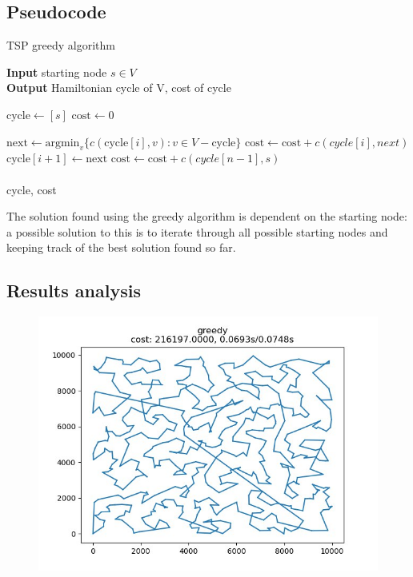 \subsection{Pseudocode}
\begin{algorithm}[h]
    \caption{TSP greedy algorithm}

    \textbf{Input} starting node $s\in V$\\
    \textbf{Output} Hamiltonian cycle of V, cost of cycle\\
    \begin{algorithmic}

        \State $\mbox{cycle} \gets [s]$
        \State $\mbox{cost} \gets 0$
        
            \State $\mbox{next}\gets\mbox{argmin}_v\{c(\mbox{cycle}[i],v) : v\in V - \mbox{cycle}\}$
            \State $\mbox{cost}\gets\mbox{cost}+c(cycle[i], next)$
            \State $\mbox{cycle}[i+1]\gets\mbox{next}$
        \EndFor
        \State $\mbox{cost}\gets\mbox{cost}+c(cycle[n-1],s)$\\\\
        \Return cycle, cost
    \end{algorithmic}
\end{algorithm}
\FloatBarrier

The solution found using the greedy algorithm is dependent on the starting node: a possible solution to this is to iterate through all possible starting nodes and keeping track of the best solution found so far.

\newpage

\subsection{Results analysis}
\begin{figure}[h]
    \centering
    \includegraphics*[width=.6\textwidth]{../solutions/1_600_greedy.jpg}
\end{figure}


